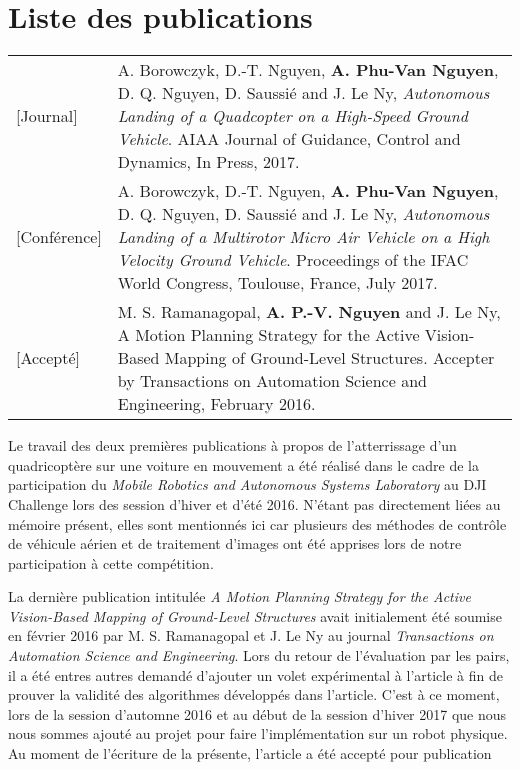 \chapter*{Liste des publications}

\begin{longtable}{lp{5in}}
  [Journal]     & A. Borowczyk, D.-T. Nguyen, \textbf{A. Phu-Van Nguyen}, D. Q. Nguyen, D. Saussié and J. Le Ny, \textit{Autonomous Landing of a Quadcopter on a High-Speed Ground Vehicle}. AIAA Journal of Guidance, Control and Dynamics, In Press, 2017.\\

  [Conférence]  & A. Borowczyk, D.-T. Nguyen, \textbf{A. Phu-Van Nguyen}, D. Q. Nguyen, D. Saussié and J. Le Ny, \textit{Autonomous Landing of a Multirotor Micro Air Vehicle on a High Velocity Ground Vehicle}. Proceedings of the IFAC World Congress, Toulouse, France, July 2017.\\

  [Accepté]      & M. S. Ramanagopal, \textbf{A. P.-V. Nguyen} and J. Le Ny, A Motion Planning Strategy for the Active Vision-Based Mapping of Ground-Level Structures. Accepter by Transactions on Automation Science and Engineering, February 2016.
\end{longtable}

Le travail des deux premières publications à propos de l'atterrissage d'un quadricoptère sur une voiture en mouvement a été réalisé dans le cadre de la participation du \textit{Mobile Robotics and Autonomous Systems Laboratory} au DJI Challenge lors des session d'hiver et d'été 2016. N'étant pas directement liées au mémoire présent, elles sont mentionnés ici car plusieurs des méthodes de contrôle de véhicule aérien et de traitement d'images ont été apprises lors de notre participation à cette compétition.

La dernière publication intitulée \textit{A Motion Planning Strategy for the Active Vision-Based Mapping of Ground-Level Structures} avait initialement été soumise en février 2016 par M. S. Ramanagopal et J. Le Ny au journal \textit{Transactions on Automation Science and Engineering}. Lors du retour de l'évaluation par les pairs, il a été entres autres demandé d'ajouter un volet expérimental à l'article à fin de prouver la validité des algorithmes développés dans l'article. C'est à ce moment, lors de la session d'automne 2016 et au début de la session d'hiver 2017 que nous nous sommes ajouté au projet pour faire l'implémentation sur un robot physique. Au moment de l'écriture de la présente, l'article a été accepté pour publication 